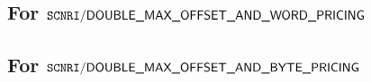 \subsection{For $\texttt{SCNRI}\textsf{/}{\textsf{DOUBLE\_MAX\_OFFSET\_AND\_WORD\_PRICING}}$}                                                      
\subsection{For $\texttt{SCNRI}\textsf{/}{\textsf{DOUBLE\_MAX\_OFFSET\_AND\_BYTE\_PRICING}}$}                                                      









